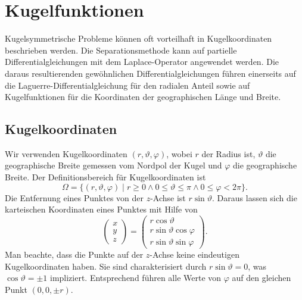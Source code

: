 %
%
%
\section{Kugelfunktionen
\label{buch:pde:section:kugel}}
Kugelsymmetrische Probleme können oft vorteilhaft in Kugelkoordinaten
beschrieben werden.
Die Separationsmethode kann auf partielle Differentialgleichungen
mit dem Laplace-Operator angewendet werden.
Die daraus resultierenden gewöhnlichen Differentialgleichungen führen
einerseits auf die Laguerre-Differentialgleichung für den radialen
Anteil sowie auf Kugelfunktionen für die Koordinaten der
geographischen Länge und Breite.

\subsection{Kugelkoordinaten}
Wir verwenden Kugelkoordinaten $(r,\vartheta,\varphi)$, wobei $r$
der Radius ist, $\vartheta$ die geographische Breite gemessen vom
Nordpol der Kugel und $\varphi$ die geographische Breite.
Der Definitionsbereich für Kugelkoordinaten ist
\[
\Omega
=
\{(r,\vartheta,\varphi)
\;|\;
r\ge 0\wedge 
0\le \vartheta\le \pi\wedge
0\le \varphi< 2\pi
\}.
\]
Die Entfernung eines Punktes von der $z$-Achse ist $r\sin\vartheta$.
Daraus lassen sich die karteischen Koordinaten eines Punktes mit Hilfe
von
\[
\begin{pmatrix}x\\y\\z\end{pmatrix}
=
\begin{pmatrix}
r\cos\vartheta\\
r\sin\vartheta\cos\varphi\\
r\sin\vartheta\sin\varphi
\end{pmatrix}.
\]
Man beachte, dass die Punkte auf der $z$-Achse keine eindeutigen
Kugelkoordinaten haben.
Sie sind charakterisiert durch $r\sin\vartheta=0$, was $\cos\vartheta=\pm1$
impliziert.
Entsprechend führen alle Werte von $\varphi$ auf den gleichen Punkt
$(0,0,\pm r)$.

